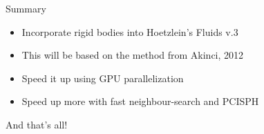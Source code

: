 \documentclass[12pt]{beamer}
\begin{document}

\begin{frame}[t]{Summary}
\pause 

\begin{itemize}[<+->]
\item Incorporate rigid bodies into Hoetzlein's Fluids v.3
\item This will be based on the method from Akinci, 2012
\item Speed it up using GPU parallelization
\item Speed up more with fast neighbour-search and PCISPH 
\end{itemize}

\begin{center}
\color{green} And that's all!
\end{center}

\end{frame}















\end{document}
